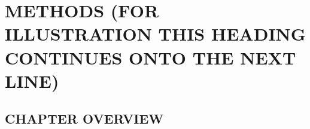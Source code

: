 
\chapter{METHODS (FOR ILLUSTRATION THIS HEADING CONTINUES ONTO THE NEXT LINE)}

\section{CHAPTER OVERVIEW}




